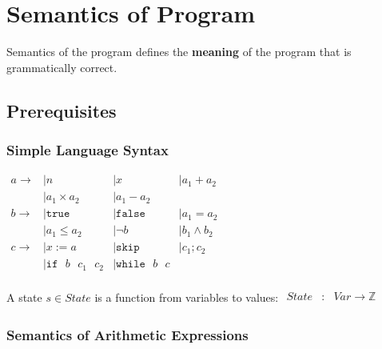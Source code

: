 \section{Semantics of Program}
\label{sec:semantics}

Semantics of the program defines the \textbf{meaning} of the program
that is grammatically correct.

\subsection{Prerequisites}

\subsubsection{Simple Language Syntax}

\begin{math}
  \begin{array}{llll}
    a \to & \mid n & \mid x & \mid a_1 + a_2 \\
          & \mid a_1 \times a_2 & \mid a_1 - a_2 \\
    b \to & \mid \mathtt{true} & \mid \mathtt{false} & \mid a_1 = a_2  \\
          & \mid a_1 \leq a_2 & \mid \neg b & \mid b_1 \land b_2 \\
    c \to & \mid x := a  & \mid \mathtt{skip} & \mid c_1 ; c_2 \\
          & \mid \mathtt{if} \text{ }b \text{ }c_1\text{ }c_2 & \mid \mathtt{while} \text{ }b \text{ }c \\
  \end{array}
\end{math}

A state $ s \in State $ is a function from variables to values:
\begin{math}
  \begin{array}{rcl}
    State & : & Var \to \mathbb{Z} \\
  \end{array}
\end{math}


\subsubsection{Semantics of Arithmetic Expressions}

